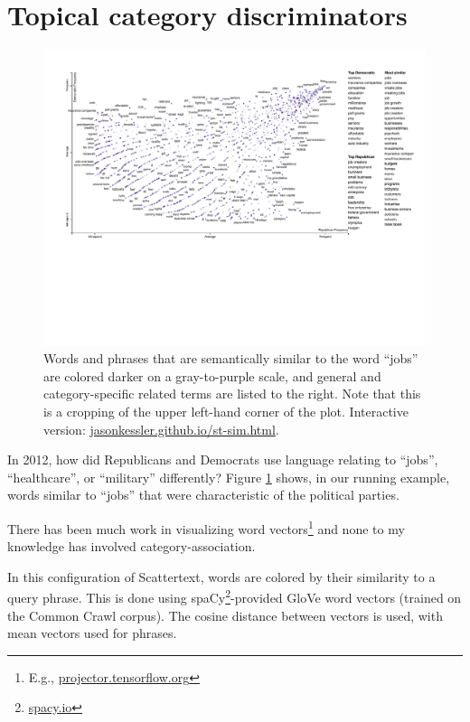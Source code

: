 \documentclass[11pt,a4paper]{article}
\begin{document}
\section{Topical category discriminators}
\begin{figure}[h]
  \includegraphics[width=\linewidth]{similarity_scattertext_portion}
  \caption{Words and phrases that are semantically similar to the word ``jobs'' are colored darker on a gray-to-purple scale, and general and category-specific related terms are listed to the right. Note that this is a cropping of the upper left-hand corner of the plot. Interactive version: \href{https://jasonkessler.github.io/st-sim.html}{jasonkessler.github.io/st-sim.html}.}
  \label{scattertextembeddings}
\end{figure}
\label{embeddings}
In 2012, how did Republicans and Democrats use language relating to ``jobs'', ``healthcare'', or ``military'' differently?   Figure \ref{scattertextembeddings} shows, in our running example, words similar to ``jobs'' that were characteristic of the political parties.  

There has been much work in visualizing word vectors\footnote{E.g., \href{http://projector.tensorflow.org/}{projector.tensorflow.org}} and none to my knowledge has involved category-association.

In this configuration of Scattertext, words are colored by their similarity to a query phrase.  This is done using spaCy\footnote{\href{https://spacy.io/}{spacy.io}}-provided GloVe \cite{glove} word vectors (trained on the Common Crawl corpus). The cosine distance between vectors is used, with mean vectors used for phrases.
\end{document}
